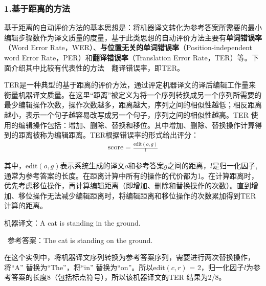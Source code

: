 
\subsubsection{1.基于距离的方法}

\parinterval 基于距离的自动评价方法的基本思想是：将机器译文转化为参考答案所需要的最小编辑步骤数作为译文质量的度量，基于此类思想的自动评价方法主要有{\small\sffamily\bfseries{单词错误率}}（Word Error Rate，WER）、{\small\sffamily\bfseries{与位置无关的单词错误率}}（Position-independent word Error Rate，PER）和{\small\sffamily\bfseries{翻译错误率}}（Translation Error Rate，TER）等。下面介绍其中比较有代表性的方法\ \dash \ 翻译错误率，即TER。

\parinterval TER是一种典型的基于距离的评价方法，通过评定机器译文的译后编辑工作量来衡量机器译文质量。在这里“距离”被定义为将一个序列转换成另一个序列所需要的最少编辑操作次数，操作次数越多，距离越大，序列之间的相似性越低；相反距离越小，表示一个句子越容易改写成另一个句子，序列之间的相似性越高。TER 使用的编辑操作包括：增加、删除、替换和移位。其中增加、删除、替换操作计算得到的距离被称为编辑距离。TER根据错误率的形式给出评分：
\begin{eqnarray}
\textrm{score}= \frac{\textrm{edit}(o,g)}{l}
\label{eq:4-3}
\end{eqnarray}

\noindent 其中，$\textrm{edit}(o,g)$表示系统生成的译文$o$和参考答案$g$之间的距离，$l$是归一化因子,通常为参考答案的长度。在距离计算中所有的操作的代价都为1。在计算距离时，优先考虑移位操作，再计算编辑距离（即增加、删除和替换操作的次数）。直到增加、移位操作无法减少编辑距离时，将编辑距离和移位操作的次数累加得到TER计算的距离。

\begin{example}
机器译文：A cat is standing in the ground.

\qquad\ 参考答案：The cat is standing on the ground.
\label{eg:4-1}
\end{example}

\parinterval 在这个实例中，将机器译文序列转换为参考答案序列，需要进行两次替换操作，将“A” 替换为“The”，将“in” 替换为“on”。所以$\textrm{edit}(c,r)$ = 2，归一化因子$l$为参考答案的长度8（包括标点符号），所以该机器译文的TER 结果为2/8。

